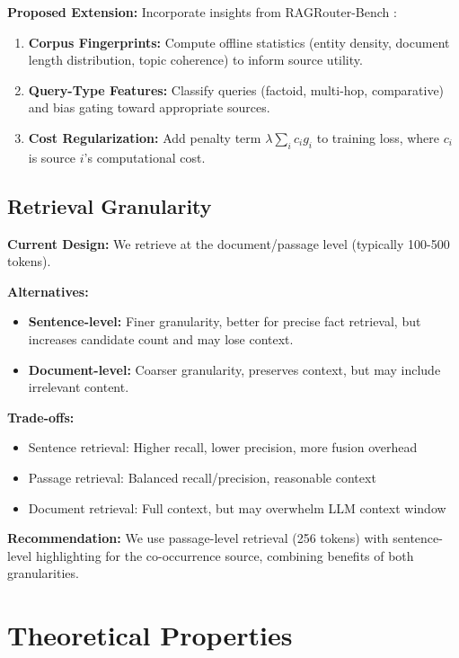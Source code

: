 \documentclass[11pt,a4paper]{article}
\begin{document}
\textbf{Proposed Extension:} Incorporate insights from RAGRouter-Bench \citep{ragrouter2024}:
\begin{enumerate}
    \item \textbf{Corpus Fingerprints:} Compute offline statistics (entity density, document length distribution, topic coherence) to inform source utility.
    
    \item \textbf{Query-Type Features:} Classify queries (factoid, multi-hop, comparative) and bias gating toward appropriate sources.
    
    \item \textbf{Cost Regularization:} Add penalty term $\lambda \sum_i c_i g_i$ to training loss, where $c_i$ is source $i$'s computational cost.
\end{enumerate}

\subsection{Retrieval Granularity}
\label{sec:granularity}

\textbf{Current Design:} We retrieve at the document/passage level (typically 100-500 tokens).

\textbf{Alternatives:}
\begin{itemize}
    \item \textbf{Sentence-level:} Finer granularity, better for precise fact retrieval, but increases candidate count and may lose context.
    \item \textbf{Document-level:} Coarser granularity, preserves context, but may include irrelevant content.
\end{itemize}

\textbf{Trade-offs:}
\begin{itemize}
    \item Sentence retrieval: Higher recall, lower precision, more fusion overhead
    \item Passage retrieval: Balanced recall/precision, reasonable context
    \item Document retrieval: Full context, but may overwhelm LLM context window
\end{itemize}

\textbf{Recommendation:} We use passage-level retrieval (256 tokens) with sentence-level highlighting for the co-occurrence source, combining benefits of both granularities.

\section{Theoretical Properties}
\label{sec:properties}
\end{document}

